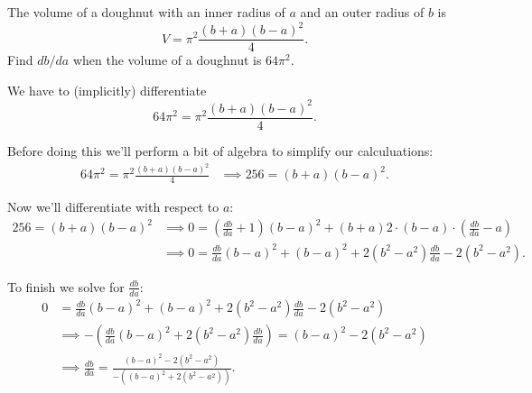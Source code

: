 \documentclass[nooutcomes]{ximera}
\renewenvironment{freeResponse}{
\ifhandout\setbox0\vbox\bgroup\else
\begin{trivlist}\item[\hskip \labelsep\bfseries Solution:\hspace{2ex}]
\fi}
{\ifhandout\egroup\else
\end{trivlist}
\fi}
\begin{document}
\begin{problem}
  The volume of a doughnut with an inner radius of $a$ and an outer radius of $b$ is 
  \[
    V = \pi^2 \frac{(b+a)(b-a)^2}{4}.
  \]
  Find $db/da$ when the volume of a doughnut is $64\pi^2$.
\begin{freeResponse}
  We have to (implicitly) differentiate
  \[
    64\pi^2 = \pi^2 \frac{(b+a)(b-a)^2}{4}.
  \]
  
  Before doing this we'll perform a bit of algebra to simplify our calculuations:
  \begin{align*}
    64\pi^2 = \pi^2 \frac{(b+a)(b-a)^2}{4} &\implies 256 =  (b+a)(b-a)^2.
  \end{align*}

  Now we'll differentiate with respect to $a$:
  \begin{align*}
    256 = (b+a)(b-a)^2 &\implies 0 = \left(\frac{db}{da} + 1\right)(b - a)^2 + (b + a) 2 \cdot (b - a) \cdot \left(\frac{db}{da} - a\right) \\
    &\implies 0 = \frac{db}{da}(b-a)^2 + (b-a)^2 + 2(b^2-a^2) \frac{db}{da} - 2(b^2 - a^2).
  \end{align*}

  To finish we solve for $\frac{db}{da}$:
  \begin{align*}
    0 &= \frac{db}{da}(b-a)^2 + (b-a)^2 + 2(b^2-a^2) \frac{db}{da} - 2(b^2 - a^2) \\
      &\implies
        - \left(\frac{db}{da}(b-a)^2 + 2(b^2-a^2) \frac{db}{da}\right) = (b-a)^2 - 2(b^2 - a^2)\\
    &\implies
      \frac{db}{da} = \frac{(b-a)^2 - 2(b^2 - a^2)}{-((b-a)^2 + 2(b^2-a^2))}.
  \end{align*}
\end{freeResponse}	
\end{problem}
\end{document}
